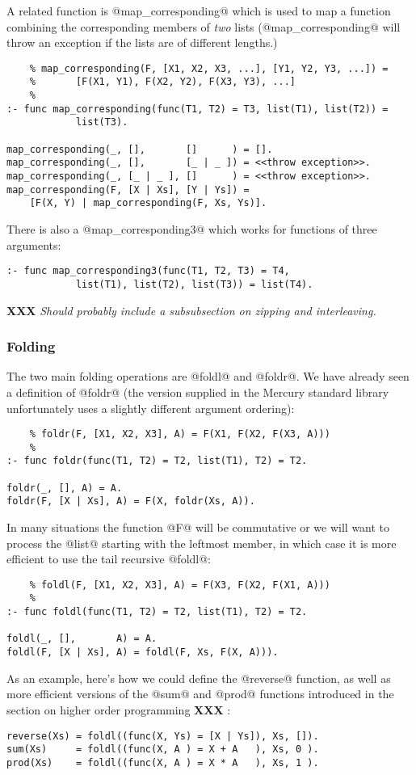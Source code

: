 \documentclass[a4paper,11pt,notitlepage,onecolumn]{article}
\newcommand{\XXX}[1]%
{{\small\textbf{XXX} \emph{#1}}}
\begin{document}
A related function is @map_corresponding@ which is used to map a
function combining the corresponding members of \emph{two} lists
(@map_corresponding@ will throw an exception if the lists are of
different lengths.)
\begin{verbatim}
    % map_corresponding(F, [X1, X2, X3, ...], [Y1, Y2, Y3, ...]) =
    %       [F(X1, Y1), F(X2, Y2), F(X3, Y3), ...]
    %
:- func map_corresponding(func(T1, T2) = T3, list(T1), list(T2)) =
            list(T3).

map_corresponding(_, [],       []      ) = [].
map_corresponding(_, [],       [_ | _ ]) = <<throw exception>>.
map_corresponding(_, [_ | _ ], []      ) = <<throw exception>>.
map_corresponding(F, [X | Xs], [Y | Ys]) =
    [F(X, Y) | map_corresponding(F, Xs, Ys)].
\end{verbatim}

There is also a @map_corresponding3@ which works for functions of three
arguments:
\begin{verbatim}
:- func map_corresponding3(func(T1, T2, T3) = T4,
            list(T1), list(T2), list(T3)) = list(T4).
\end{verbatim}

\XXX{Should probably include a subsubsection on zipping and
interleaving.}

\subsubsection{Folding}

The two main folding operations are @foldl@ and @foldr@.  We have
already seen a definition of @foldr@ (the version supplied in the
Mercury standard library unfortunately uses a slightly different
argument ordering):
\begin{verbatim}
    % foldr(F, [X1, X2, X3], A) = F(X1, F(X2, F(X3, A)))
    %
:- func foldr(func(T1, T2) = T2, list(T1), T2) = T2.

foldr(_, [], A) = A.
foldr(F, [X | Xs], A) = F(X, foldr(Xs, A)).
\end{verbatim}
In many situations the function @F@ will be commutative or we will want
to process the @list@ starting with the leftmost member, in which case
it is more efficient to use the tail recursive @foldl@:
\begin{verbatim}
    % foldl(F, [X1, X2, X3], A) = F(X3, F(X2, F(X1, A)))
    %
:- func foldl(func(T1, T2) = T2, list(T1), T2) = T2.

foldl(_, [],       A) = A.
foldl(F, [X | Xs], A) = foldl(F, Xs, F(X, A))).
\end{verbatim}
As an example, here's how we could define the @reverse@ function, as
well as more efficient versions of the @sum@ and @prod@ functions
introduced in the section on higher order programming \XXX{}:
\begin{verbatim}
reverse(Xs) = foldl((func(X, Ys) = [X | Ys]), Xs, []).
sum(Xs)     = foldl((func(X, A ) = X + A   ), Xs, 0 ).
prod(Xs)    = foldl((func(X, A ) = X * A   ), Xs, 1 ).
\end{verbatim}
\end{document}
